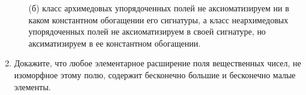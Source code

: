 \documentclass[a4paper,11pt]{article}
\begin{document}
\begin{enumerate}
\begin{enumerate}
\item[(б)] класс архимедовых упорядоченных полей не аксиоматизируем ни в каком константном обогащении его сигнатуры, а класс неархимедовых упорядоченных полей не аксиоматизируем в своей сигнатуре, но аксиматизируем в ее константном обогащении. 
\end{enumerate}

	\item Докажите, что любое элементарное расширение поля вещественных чисел, не изоморфное этому полю, содержит бесконечно большие и бесконечно малые элементы.
\end{enumerate}
\end{document}
